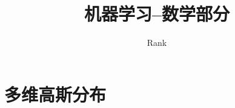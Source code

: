 \documentclass[11pt]{article}
\title{机器学习--数学部分}
\author{Rank}
\affil{公众号：经济知识综合 \\ \email{fanxiaolong98@gmail.com}}
\numberwithin{equation}{section}
\numberwithin{figure}{section}
\begin{document}
\maketitle
\newpage
\tableofcontents
\newpage
\section{多维高斯分布}
\end{document}
